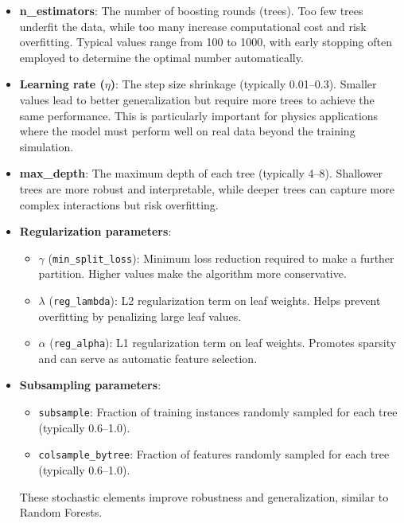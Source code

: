 \begin{itemize}
    \item \textbf{n\_estimators}: The number of boosting rounds (trees). Too few trees underfit the data, while too many increase computational cost and risk overfitting. Typical values range from 100 to 1000, with early stopping often employed to determine the optimal number automatically.
    
    \item \textbf{Learning rate ($\eta$)}: The step size shrinkage (typically 0.01–0.3). Smaller values lead to better generalization but require more trees to achieve the same performance. This is particularly important for physics applications where the model must perform well on real data beyond the training simulation.
    
    \item \textbf{max\_depth}: The maximum depth of each tree (typically 4–8). Shallower trees are more robust and interpretable, while deeper trees can capture more complex interactions but risk overfitting.
    
    \item \textbf{Regularization parameters}:
    \begin{itemize}
        \item $\gamma$ (\texttt{min\_split\_loss}): Minimum loss reduction required to make a further partition. Higher values make the algorithm more conservative.
        \item $\lambda$ (\texttt{reg\_lambda}): L2 regularization term on leaf weights. Helps prevent overfitting by penalizing large leaf values.
        \item $\alpha$ (\texttt{reg\_alpha}): L1 regularization term on leaf weights. Promotes sparsity and can serve as automatic feature selection.
    \end{itemize}
    
    \item \textbf{Subsampling parameters}:
    \begin{itemize}
        \item \texttt{subsample}: Fraction of training instances randomly sampled for each tree (typically 0.6–1.0).
        \item \texttt{colsample\_bytree}: Fraction of features randomly sampled for each tree (typically 0.6–1.0).
    \end{itemize}
    These stochastic elements improve robustness and generalization, similar to Random Forests.
\end{itemize}


